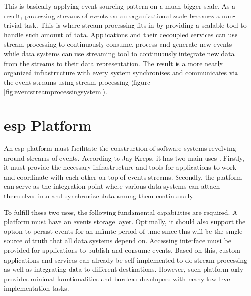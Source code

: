 This is basically applying event sourcing pattern on a much bigger scale. As a result, processing streams of events on an organizational scale becomes a non-trivial task. This is where stream processing fits in by providing a scalable tool to handle such amount of data. Applications and their decoupled services can use stream processing to continuously consume, process and generate new events while data systems can use streaming tool to continuously integrate new data from the streams to their data representation. The result is a more neatly organized infrastructure with every system synchronizes and communicates via the event streams using stream processing (figure \ref{fig:eventstreamprocessingsystem}). 






\section{\acrlong{esp} Platform} \label{section:general-ESP-platform}
An \acrshort{esp} platform must facilitate the construction of software systems revolving around streams of events. According to Jay Kreps, it has two main uses \cite{eventstreamingplatform}. Firstly, it must provide the necessary infrastructure and tools for applications to work and coordinate with each other on top of events streams. Secondly, the platform can serve as the integration point where various data systems can attach themselves into and synchronize data among them continuously.

To fulfill these two uses, the following fundamental capabilities are required. A platform must have an events storage layer. Optimally, it should also support the option to persist events for an infinite period of time since this will be the single source of truth that all data systems depend on. Accessing interface must be provided for applications to publish and consume events. Based on this, custom applications and services can already be self-implemented to do stream processing as well as integrating data to different destinations. However, such platform only provides minimal functionalities and burdens developers with many low-level implementation tasks.

